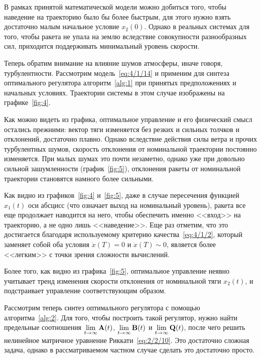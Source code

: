 В рамках принятой математической модели можно добиться того, чтобы наведение на траекторию было бы более быстрым, для этого нужно взять достаточно малым начальное условие $x_2(0)$. Однако в реальных системах для того, чтобы ракета не упала на землю вследствие совокупности разнообразных сил, приходится поддерживать минимальный уровень скорости.

\br

Теперь обратим внимание на влияние шумов атмосферы, иначе говоря, турбулентности. Рассмотрим модель~\ref{eq:4/1/14} и применим для синтеза оптимального регулятора алгоритм~\ref{alg:1} при принятых предположениях и начальных условиях. Траектории системы в этом случае изображены на графике~\ref{fig:4}.


Как можно видеть из графика, оптимальное управление и его физический смысл остались прежними: вектор тяги изменяется без резких и сильных толчков и отклонений, достаточно плавно. Однако вследствие действия силы ветра и прочих турбулентных шумов, скорость отклонения от номинальной траектории постоянно изменяется. При малых шумах это почти незаметно, однако уже при довольно сильной зашумленности (график~\ref{fig:5}), отклонения ракеты от номинальной траектории становятся намного более сильными.


Как видно из графиков~\ref{fig:4} и~\ref{fig:5}, даже в случае пересечения функцией $x_1(t)$ оси абсцисс (что означает выход на номинальный уровень), ракета все еще продолжает наводится на него, чтобы обеспечить именно <<вход>> на траекторию, а не одно лишь <<наведение>>. Еще раз отметим, что это достигается благодаря используемому критерию качества~\vref{eq:4/1/2}, который заменяет собой оба условия $\dot{x}(T)=0$ и $\ddot{x}(T) \sim 0$, является более <<легким>> с точки зрения сложности вычислений.

Более того, как видно из графика~\ref{fig:5}, оптимальное управление неявно учитывает тренд изменения скорости отклонения от номинальной тяги $x_2(t)$, и подстраивает управление соответствующим образом.

\br

Рассмотрим теперь синтез оптимального регулятора с помощью алгоритма~\vref{alg:2}. Для того, чтобы построить такой регулятор, нужно найти предельные соотношения $\lim\limits_{t \to \infty} \mathbf{A}(t)$, $\lim\limits_{t \to \infty} \mathbf{B}(t)$ и $\lim\limits_{t \to \infty} \mathbf{Q}(t)$, после чего решить нелинейное матричное уравнение Риккати~\vref{eq:2/2/10}. Это достаточно сложная задача, однако в рассматриваемом частном случае сделать это достаточно просто.

